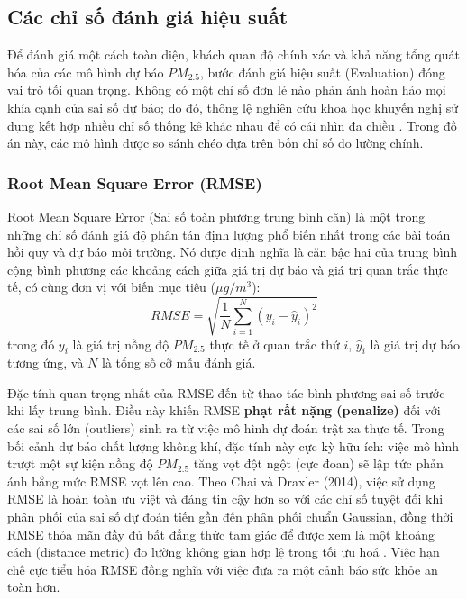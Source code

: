 \subsection{Các chỉ số đánh giá hiệu suất}

Để đánh giá một cách toàn diện, khách quan độ chính xác và khả năng tổng quát hóa của các mô hình dự báo $PM_{2.5}$, bước đánh giá hiệu suất (Evaluation) đóng vai trò tối quan trọng. Không có một chỉ số đơn lẻ nào phản ánh hoàn hảo mọi khía cạnh của sai số dự báo; do đó, thông lệ nghiên cứu khoa học khuyến nghị sử dụng kết hợp nhiều chỉ số thống kê khác nhau để có cái nhìn đa chiều \cite{chai2014rmse, armstrong1992mape}. Trong đồ án này, các mô hình được so sánh chéo dựa trên bốn chỉ số đo lường chính.

\subsubsection{Root Mean Square Error (RMSE)}

Root Mean Square Error (Sai số toàn phương trung bình căn) là một trong những chỉ số đánh giá độ phân tán định lượng phổ biến nhất trong các bài toán hồi quy và dự báo môi trường. Nó được định nghĩa là căn bậc hai của trung bình cộng bình phương các khoảng cách giữa giá trị dự báo và giá trị quan trắc thực tế, có cùng đơn vị với biến mục tiêu ($\mu g/m^3$):
\begin{equation}
    RMSE = \sqrt{\frac{1}{N} \sum_{i=1}^{N} \left( y_i - \hat{y}_i \right)^2}
\end{equation}
trong đó $y_i$ là giá trị nồng độ $PM_{2.5}$ thực tế ở quan trắc thứ $i$, $\hat{y}_i$ là giá trị dự báo tương ứng, và $N$ là tổng số cỡ mẫu đánh giá.

Đặc tính quan trọng nhất của RMSE đến từ thao tác bình phương sai số trước khi lấy trung bình. Điều này khiến RMSE \textbf{phạt rất nặng (penalize)} đối với các sai số lớn (outliers) sinh ra từ việc mô hình dự đoán trật xa thực tế. Trong bối cảnh dự báo chất lượng không khí, đặc tính này cực kỳ hữu ích: việc mô hình trượt một sự kiện nồng độ $PM_{2.5}$ tăng vọt đột ngột (cực đoan) sẽ lập tức phản ánh bằng mức RMSE vọt lên cao. Theo Chai và Draxler (2014), việc sử dụng RMSE là hoàn toàn ưu việt và đáng tin cậy hơn so với các chỉ số tuyệt đối khi phân phối của sai số dự đoán tiến gần đến phân phối chuẩn Gaussian, đồng thời RMSE thỏa mãn đầy đủ bất đẳng thức tam giác để được xem là một khoảng cách (distance metric) đo lường không gian hợp lệ trong tối ưu hoá \cite{chai2014rmse}. Việc hạn chế cực tiểu hóa RMSE đồng nghĩa với việc đưa ra một cảnh báo sức khỏe an toàn hơn.

